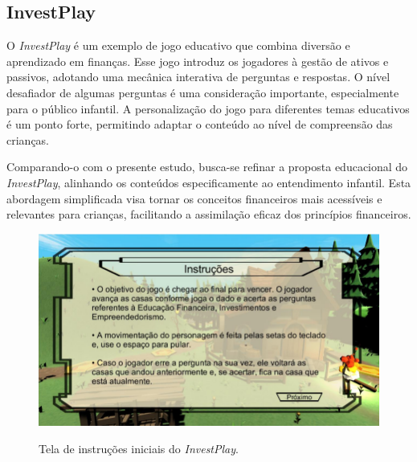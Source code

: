 \newpage

\subsection{InvestPlay}
O \textit{InvestPlay} \cite{santos2020investplay} é um exemplo de jogo educativo que combina diversão e aprendizado em finanças. Esse jogo introduz os jogadores à gestão de ativos e passivos, adotando uma mecânica interativa de perguntas e respostas. O nível desafiador de algumas perguntas é uma consideração importante, especialmente para o público infantil. A personalização do jogo para diferentes temas educativos é um ponto forte, permitindo adaptar o conteúdo ao nível de compreensão das crianças.

Comparando-o com o presente estudo, busca-se refinar a proposta educacional do \textit{InvestPlay}, alinhando os conteúdos especificamente ao entendimento infantil. Esta abordagem simplificada visa tornar os conceitos financeiros mais acessíveis e relevantes para crianças, facilitando a assimilação eficaz dos princípios financeiros.

\begin{figure}[ht]
	\centering
	\caption{Tela de instruções iniciais do \textit{InvestPlay}.}
	\includegraphics[scale=0.6]{Textuais/Pictures/invest-play-1.png}
	\label{fig:invest-play-1}
\end{figure}

